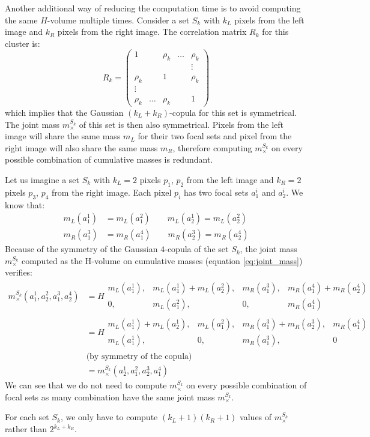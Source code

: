 Another additional way of reducing the computation time is to avoid computing the same $H$-volume multiple times. Consider a set $S_k$ with $k_L$ pixels from the left image and $k_R$ pixels from the right image. The correlation matrix $R_k$ for this cluster is:
\begin{equation}
    R_k=\begin{pmatrix}
        1 &  & \rho_k & \dots & \rho_k\\
         & & & & \vdots\\
        \rho_k &  & 1 & & \rho_k\\
        \vdots &  &  & & \\
        \rho_k & \dots & \rho_k &  & 1
    \end{pmatrix}\label{eq:corr_matrix_sym}
\end{equation}
which implies that the Gaussian $(k_L+k_R)$-copula for this set is symmetrical. The joint mass $m^{S_k}_\times$ of this set is then also symmetrical. Pixels from the left image will share the same mass $m_L$ for their two focal sets and pixel from the right image will also share the same mass $m_R$, therefore computing $m^{S_k}_\times$ on every possible combination of cumulative masses is redundant. 
\begin{example}
    Let us imagine a set $S_k$ with $k_L=2$ pixels $p_1$, $p_2$ from the left image and $k_R=2$ pixels $p_3$, $p_4$ from the right image. Each pixel $p_i$ has two focal sets $a^i_1$ and $a^i_2$.
    We know that:
    \begin{align*}
        m_L(a_1^1) &= m_L(a_1^2) \qquad m_L(a_2^1) = m_L(a_2^2)\\
        m_R(a_1^3) &= m_R(a_1^4) \qquad m_R(a_2^3) = m_R(a_2^4)
    \end{align*}
    Because of the symmetry of the Gaussian $4$-copula of the set $S_k$, the joint mass $m^{S_k}_\times$ computed as the H-volume on cumulative masses (equation \eqref{eq:joint_mass}) verifies:
    \begin{align*}
        m^{S_k}_\times(a_1^1, a_2^2, a_1^3, a_2^4) &= H
        \begin{matrix}
            m_L(a_1^1), & m_L(a_1^1)+m_L(a_2^2), & m_R(a_1^3), & m_R(a_1^4)+m_R(a_2^4)\\
            0, & m_L(a^2_1), & 0, & m_R(a_1^4)
        \end{matrix}\\
        &=H
        \begin{matrix}
            m_L(a_1^1)+m_L(a_2^1), & m_L(a_1^2), & m_R(a_1^3)+m_R(a_2^3), & m_R(a_1^4)\\
            m_L(a^1_1), & 0, & m_R(a_1^3), & 0
        \end{matrix}\\
        &\text{(by symmetry of the copula)}\\
        &= m^{S_k}_\times(a_2^1, a_1^2, a_2^3, a_1^4)
    \end{align*}
    We can see that we do not need to compute $m^{S_k}_\times$ on every possible combination of focal sets as many combination have the same joint mass $m^{S_k}_\times$.
\end{example}
For each set $S_k$, we only have to compute $(k_L+1)(k_R+1)$ values of $m^{S_k}_\times$ rather than $2^{k_L+k_R}$.

